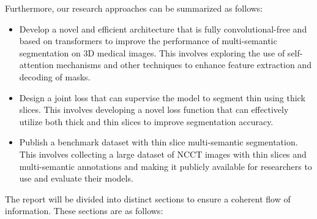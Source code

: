 \documentclass{article}
\begin{document}
Furthermore, our research approaches can be summarized as follows:

\begin{itemize}
    \item Develop a novel and efficient architecture that is fully convolutional-free and based on transformers to improve the performance of multi-semantic segmentation on 3D medical images. This involves exploring the use of self-attention mechanisms \cite{16} and other techniques to enhance feature extraction and decoding of masks.
    \item Design a joint loss that can supervise the model to segment thin using thick slices. This involves developing a novel loss function that can effectively utilize both thick and thin slices to improve segmentation accuracy.
    \item Publish a benchmark dataset with thin slice multi-semantic segmentation. This involves collecting a large dataset of NCCT images with thin slices and multi-semantic annotations and making it publicly available for researchers to use and evaluate their models.
\end{itemize}

The report will be divided into distinct sections to ensure a coherent flow of information. These sections are as follows:
\end{document}
